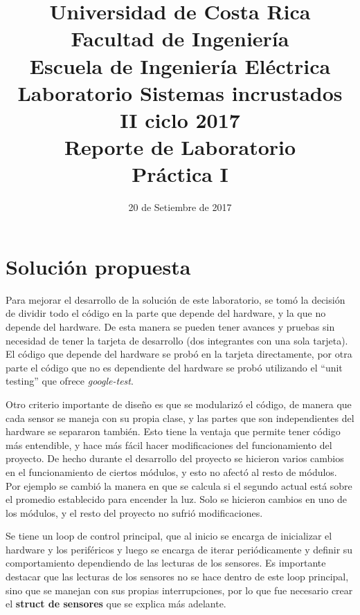 

\title{Universidad de Costa Rica\\{\small Facultad de Ingeniería\\Escuela de Ingeniería Eléctrica\\
    Laboratorio Sistemas incrustados\\II ciclo 2017\\\vspace*{0.55in} Reporte de Laboratorio}\\ Práctica I \vspace*{1.1in}}
\date{20 de Setiembre de 2017}






\newpage
\section{Solución propuesta}

Para mejorar el desarrollo de la solución de este laboratorio, se tomó la decisión de dividir todo
el código en la parte que depende del hardware, y la que no depende del hardware. De esta manera se
pueden tener avances y pruebas sin necesidad de tener la tarjeta de desarrollo (dos integrantes con
una sola tarjeta). El código que depende del hardware se probó en la tarjeta directamente, por otra
parte el código que no es dependiente del hardware se probó utilizando el ``unit testing'' que
ofrece \textit{google-test}.

Otro criterio importante de diseño es que se modularizó el código, de manera que cada sensor se
maneja con su propia clase, y las partes que son independientes del hardware se separaron
también. Esto tiene la ventaja que permite tener código más entendible, y hace más fácil hacer
modificaciones del funcionamiento del proyecto. De hecho durante el desarrollo del proyecto se
hicieron varios cambios en el funcionamiento de ciertos módulos, y esto no afectó al resto de
módulos. Por ejemplo se cambió la manera en que se calcula si el segundo actual está sobre el
promedio establecido para encender la luz. Solo se hicieron cambios en uno de los módulos, y el
resto del proyecto no sufrió modificaciones.

Se tiene un loop de control principal, que al inicio se encarga de inicializar el hardware y los
periféricos y luego se encarga de iterar periódicamente y definir su comportamiento dependiendo de
las lecturas de los sensores. Es importante destacar que las lecturas de los sensores no se hace
dentro de este loop principal, sino que se manejan con sus propias interrupciones, por lo que fue
necesario crear el \textbf{struct de sensores} que se explica más adelante. 


